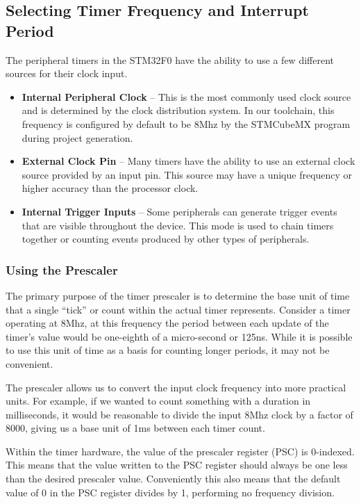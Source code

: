 \documentclass[11pt,fleqn]{book} %
\begin{document}
    \subsection{Selecting Timer Frequency and Interrupt Period}	
    The peripheral timers in the STM32F0 have the ability to use a few different sources for their clock input. 
    \begin{itemize}
        \item\textbf{Internal Peripheral Clock} -- This is the most commonly used clock source and is determined by the clock distribution system. In our toolchain, this frequency is configured by default to be 8Mhz by the STMCubeMX program during project generation. 
        \item\textbf{External Clock Pin} -- Many timers have the ability to use an external clock source provided by an input pin. This source may have a unique frequency or higher accuracy than the processor clock.
        \item\textbf{Internal Trigger Inputs} -- Some peripherals can generate trigger events that are visible throughout the device. This mode is used to chain timers together or counting events produced by other types of peripherals.
    \end{itemize}
 
 
    \subsubsection{Using the Prescaler}
      
        The primary purpose of the timer prescaler is to determine the base unit of time that a single ``tick'' or count within the actual timer represents. Consider a timer operating at 8Mhz, at this frequency the period between each update of the timer's value would be one-eighth of a micro-second or 125ns. While it is possible to use this unit of time as a basis for counting longer periods, it may not be convenient. 
        
        The prescaler allows us to convert the input clock frequency into more practical units. For example, if we wanted to count something with a duration in milliseconds, it would be reasonable to divide the input 8Mhz clock by a factor of 8000, giving us a base unit of 1ms between each timer count. 
        
        Within the timer hardware, the value of the prescaler register (PSC) is 0-indexed. This means that the value written to the PSC register should always be one less than the desired prescaler value. Conveniently this also means that the default value of 0 in the PSC register divides by 1, performing no frequency division.  
\end{document}
